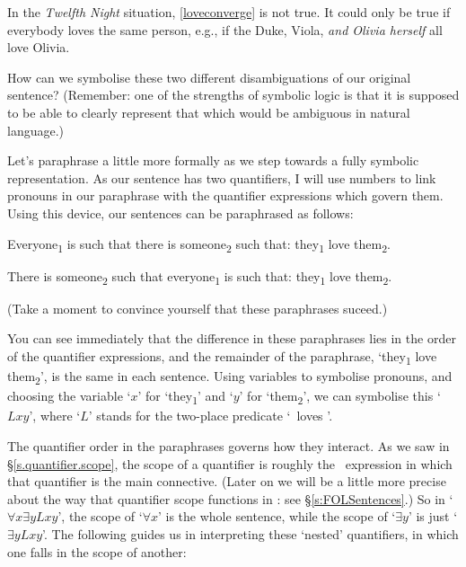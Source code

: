 In the \emph{Twelfth Night} situation, \ref{loveconverge} is not true. It could only be true if everybody loves the same person, e.g., if the Duke, Viola, \emph{and Olivia herself} all love Olivia. 


How can we symbolise these two different disambiguations of our original sentence? (Remember: one of the strengths of symbolic logic is that it is supposed to be able to clearly represent that which would be ambiguous in natural language.)

Let's paraphrase a little more formally as we step towards a fully symbolic representation. As our sentence has two quantifiers, I will use numbers to link pronouns in our paraphrase with the quantifier expressions which govern them. Using this device, our sentences can be paraphrased as follows: \begin{earg}
	\item[\ex{lovecycle1}] Everyone\textsubscript{1} is such that there is someone\textsubscript{2} such that: they\textsubscript{1} love them\textsubscript{2}. 
	\item[\ex{loveconverge1}] There is someone\textsubscript{2} such that everyone\textsubscript{1} is such that: they\textsubscript{1} love them\textsubscript{2}.
\end{earg} (Take a moment to convince yourself that these paraphrases suceed.)

You can see immediately that the difference in these paraphrases lies in the order of the quantifier expressions, and the remainder of the paraphrase, `they\textsubscript{1} love them\textsubscript{2}', is the same in each sentence. Using variables to symbolise pronouns, and choosing the variable `$x$' for `they\textsubscript{1}' and `$y$' for `them\textsubscript{2}', we can symbolise this `$Lxy$', where `$L$' stands for the two-place predicate `\ loves '. 

The quantifier order in the paraphrases governs how they interact. As we saw in §\ref{s.quantifier.scope}, the scope of a quantifier is roughly the \FOL\ expression in which that quantifier is the main connective. (Later on we will be a little more precise about the way that quantifier scope functions in \FOL: see §\ref{s:FOLSentences}.) So in `$\forall x \exists y Lxy$', the scope of `$\forall x$' is the whole sentence, while the scope of `$\exists y$' is just `$\exists y Lxy$'. The following guides us in interpreting these `nested' quantifiers, in which one falls in the scope of another:  

